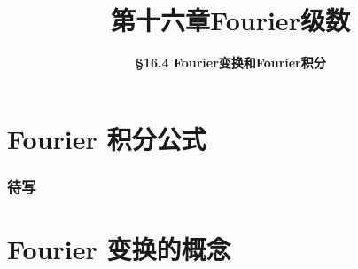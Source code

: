 \everymath{\displaystyle}



\title[第十六章\\
Fourier级数]{\texorpdfstring{\LARGE \bfseries 第十六章\quad Fourier级数}{第十六章 Fourier级数}} %
\author[\smaller \S 16.4\\
Fourier变换] %
{\Large \bfseries \S 16.4 Fourier变换和Fourier积分}
\date{}





\begin{frame}

\titlepage %

\end{frame}



\section{Fourier 积分公式}


\begin{frame}
\frametitle{待写}

\end{frame}


\section{Fourier 变换的概念}


